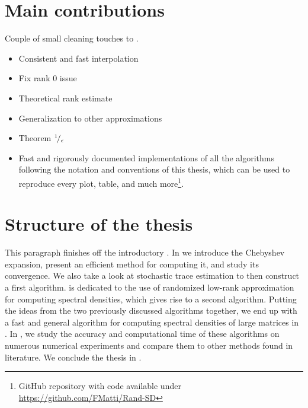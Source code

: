 \section{Main contributions}
\label{sec:1-introduction-contributions}

Couple of small cleaning touches to \cite{lin2017randomized}.%

\begin{itemize}
    \item Consistent and fast interpolation %
    \item Fix rank 0 issue
    \item Theoretical rank estimate
    \item Generalization to other approximations
    \item Theorem ${}^{1}\!/_{\epsilon}$
    \item Fast and rigorously documented implementations of all the algorithms
          following the notation and conventions of this thesis, which can be used to
          reproduce every plot, table, and much more\footnote{GitHub repository with
          code available under \url{https://github.com/FMatti/Rand-SD}}.
\end{itemize}


\section{Structure of the thesis}
\label{sec:1-introduction-structure}

This paragraph finishes off the introductory .
In  we introduce the Chebyshev expansion, present an
efficient method for computing it, and study its convergence. We also take a
look at stochastic trace estimation to then construct a first algorithm.
 is dedicated to the use of randomized low-rank approximation
for computing spectral densities, which gives rise to a second algorithm.
Putting the ideas from the two previously discussed algorithms together,
we end up with a fast and general algorithm for computing spectral densities
of large matrices in . In ,
we study the accuracy and computational time of these algorithms on numerous
numerical experiments and compare them to other methods found in literature.
We conclude the thesis in .

